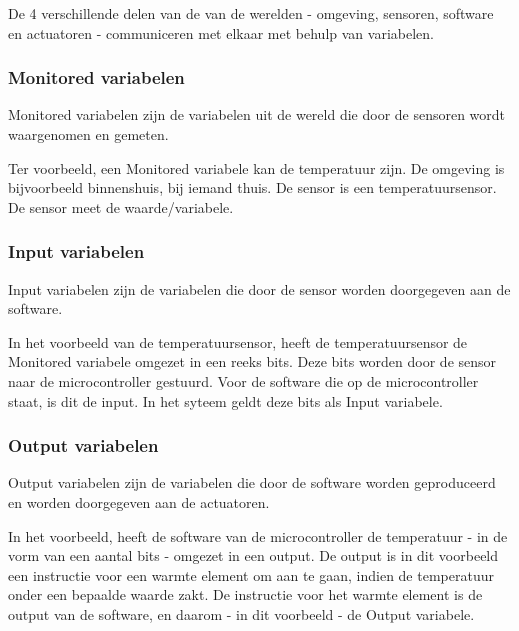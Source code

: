 \documentclass{article}
\begin{document}
		De 4 verschillende delen van de van de werelden - omgeving, sensoren, software en actuatoren - communiceren met elkaar met behulp van variabelen.
		
			\subsubsection{Monitored variabelen}
			
			Monitored variabelen zijn de variabelen uit de wereld die door de sensoren wordt waargenomen en gemeten.
			
			Ter voorbeeld, een Monitored variabele kan de temperatuur zijn. De omgeving is bijvoorbeeld binnenshuis, bij iemand thuis. De sensor is een temperatuursensor. De sensor meet de waarde/variabele.
			
			\subsubsection{Input variabelen}
			
			Input variabelen zijn de variabelen die door de sensor worden doorgegeven aan de software.

			In het voorbeeld van de temperatuursensor, heeft de temperatuursensor de Monitored variabele omgezet in een reeks bits. Deze bits worden door de sensor naar de microcontroller gestuurd. Voor de software die op de microcontroller staat, is dit de input. In het syteem geldt deze bits als Input variabele.
			
			\subsubsection{Output variabelen}
			
			Output variabelen zijn de variabelen die door de software worden geproduceerd en worden doorgegeven aan de actuatoren.

			In het voorbeeld, heeft de software van de microcontroller de temperatuur - in de vorm van een aantal bits - omgezet in een output. De output is in dit voorbeeld een instructie voor een warmte element om aan te gaan, indien de temperatuur onder een bepaalde waarde zakt. De instructie voor het warmte element is de output van de software, en daarom - in dit voorbeeld - de Output variabele.

\end{document}
